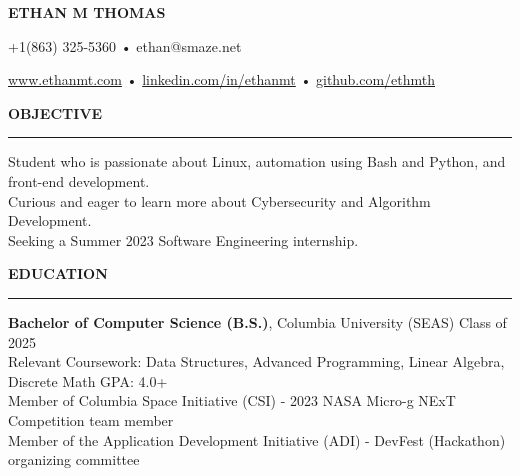 \documentclass[10pt,letterpaper]{article}
\begin{document}
\begingroup
\centerline{\MakeUppercase{\LARGE\bf Ethan M Thomas}}
\medskip
\endgroup

\begingroup
\centerline{+1(863) 325-5360 • ethan@smaze.net}
\endgroup
\par

\begingroup
\centerline{\href{www.ethanmt.com}{www.ethanmt.com} • \href{https://www.linkedin.com/in/ethanmt/}{linkedin.com/in/ethanmt} • \href{https://github.com/ethmth}{github.com/ethmth}}
\endgroup
\par


\iffalse
    \medskip
    \MakeUppercase{{\bf Objective}} %
    \medskip
    \hrule %
    \begin{list}{}{\setlength{\leftmargin}{0em}}
        \item
              {Student who is passionate about Linux, automation using Bash and Python, and front-end development.
              \\ Seeking a Summer 2023 Software Engineering internship.}
    \end{list}
\fi



\medskip
\MakeUppercase{{\bf Objective}} %
\medskip
\hrule %
\begin{list}{}{\setlength{\leftmargin}{0em}}
    \item
          {Student who is passionate about Linux, automation using Bash and Python, and front-end development.
          \\ Curious and eager to learn more about Cybersecurity and Algorithm Development.
          \\ Seeking a Summer 2023 Software Engineering internship.}
\end{list}



\medskip
\MakeUppercase{{\bf Education}}
\medskip
\hrule
\begin{list}{}{\setlength{\leftmargin}{0em}}
    \item
          {\bf Bachelor of Computer Science (B.S.)}, Columbia University (SEAS) \hfill  {Class of 2025}\\
          Relevant Coursework: Data Structures, Advanced Programming, Linear Algebra, Discrete Math \hfill {GPA: 4.0+}
          \medskip
          \\
          Member of Columbia Space Initiative (CSI) - 2023 NASA Micro-g NExT Competition team member \\
          Member of the Application Development Initiative (ADI) - DevFest (Hackathon) organizing committee
\end{list}
\end{document}
